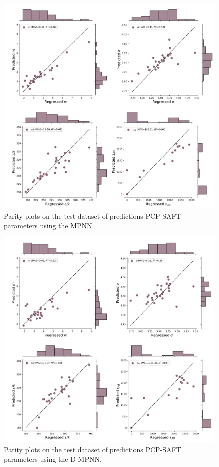 \begin{figure}
    \centering
    \includegraphics[width=\textwidth]{gfx/Chapter08/mpnn_parity_plots.png}
    \caption{Parity plots on the test dataset of predictions PCP-SAFT parameters using the MPNN.}
    \label{fig:mpnn}
\end{figure}


\begin{figure}
    \centering
    \includegraphics[width=\textwidth]{gfx/Chapter08/dmpnn_parity_plots.png}
    \caption{Parity plots on the test dataset of predictions PCP-SAFT parameters using the D-MPNN.}
    \label{fig:dmpnn}
\end{figure}

